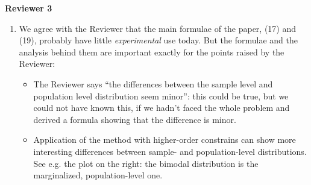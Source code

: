 \documentclass{article}
\begin{document}
\bigskip

\textbf{Reviewer 3}
\begin{enumerate}
\item We agree with the Reviewer that the main formulae of the paper, (17)
  and (19), probably have little \emph{experimental} use today. But the
  formulae and the analysis behind them are important exactly for the
  points raised by the Reviewer:
  \begin{itemize}
  \item \begin{minipage}[t]{0.74\linewidth}The Reviewer says \enquote{the
        differences between the sample level and population level
        distribution seem minor}: this could be true, but we could not have
      known this, if we hadn't faced the whole problem and derived a
      formula showing that the difference is minor.
    \end{minipage}\hspace{\fill}
  \item
    \begin{minipage}[t]{0.74\linewidth}
      Application of the method with higher-order constrains can show more
      interesting differences between sample- and population-level
      distributions. See e.g. the plot on the right: the bimodal
      distribution is the marginalized, population-level one.
    \end{minipage}

\end{itemize}
\end{enumerate}
\end{document}

